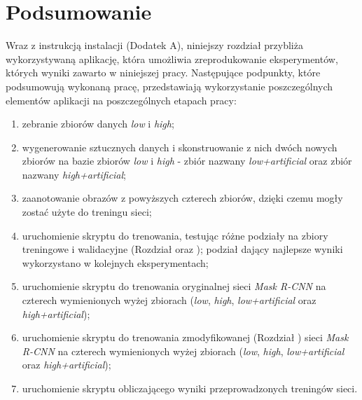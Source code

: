 \section{Podsumowanie}
Wraz z instrukcją instalacji (Dodatek A), niniejszy rozdział przybliża wykorzystywaną aplikację, która umożliwia zreprodukowanie eksperymentów, których wyniki zawarto w niniejszej pracy.
Następujące podpunkty, które podsumowują wykonaną pracę, przedstawiają wykorzystanie poszczególnych elementów aplikacji na poszczególnych etapach pracy:

\begin{enumerate}
 \item zebranie zbiorów danych \textit{low} i \textit{high};
 \item wygenerowanie sztucznych danych i skonstruowanie z nich dwóch nowych zbiorów na bazie zbiorów \textit{low} i \textit{high} - zbiór nazwany \textit{low+artificial} oraz zbiór nazwany \textit{high+artificial};
 \item zaanotowanie obrazów z powyższych czterech zbiorów, dzięki czemu mogły zostać użyte do treningu sieci;
 \item uruchomienie skryptu do trenowania, testując różne podziały na zbiory treningowe i walidacyjne (Rozdział  oraz ); podział dający najlepsze wyniki wykorzystano w kolejnych eksperymentach;
 \item uruchomienie skryptu do trenowania oryginalnej sieci \textit{Mask R-CNN} na czterech wymienionych wyżej zbiorach (\textit{low}, \textit{high}, \textit{low+artificial} oraz \textit{high+artificial});
 \item uruchomienie skryptu do trenowania zmodyfikowanej (Rozdział ) sieci \textit{Mask R-CNN} na czterech wymienionych wyżej zbiorach (\textit{low}, \textit{high}, \textit{low+artificial} oraz \textit{high+artificial});
 \item uruchomienie skryptu obliczającego wyniki przeprowadzonych treningów sieci.
\end{enumerate}
